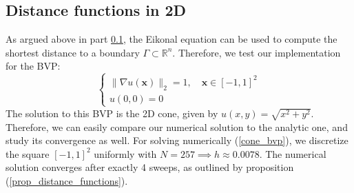 \documentclass[11pt]{article}
\theoremstyle{definition}
\theoremstyle{remark}
\newcommand{\R}{\mathbb{R}}
\begin{document}
\subsection{Distance functions in 2D}
As argued above in part \ref{}, the Eikonal equation can be used to compute the shortest distance to a boundary $\Gamma \subset \R^n$. Therefore, we test our implementation for the BVP:
\begin{equation}
\label{cone_bvp}
    \begin{cases}
        \|\nabla u(\textbf{x})\|_2=1 , \quad\textbf{x} \in[-1,1]^2\\
        u(0,0)=0
    \end{cases}
\end{equation}
The solution to this BVP is the 2D cone, given by $u(x,y)=\sqrt{x^2+y^2}$. Therefore, we can easily compare our numerical solution to the analytic one, and study its convergence as well.
For solving numerically (\ref{cone_bvp}), we discretize the square $[-1,1]^2$ uniformly with $N=257 \implies h \approx 0.0078$. The numerical solution converges after exactly 4 sweeps, as outlined by proposition (\ref{prop_distance_functions}). \\
\end{document}
